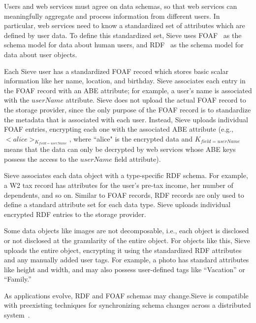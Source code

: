 Users and web services must agree on data schemas,
so that web services can meaningfully aggregate
and process information from different users. In
particular, web services need to know a
standardized set of attributes which are defined
by user data. To define this standardized set,
Sieve uses FOAF~\cite{FOAF} as the schema %
model for data about human users, and RDF~\cite{RDF} %
as the schema model for data about user objects.

Each Sieve user has a standardized FOAF record
which stores basic scalar information like
her name, location, and birthday. Sieve
associates each entry in the FOAF record
with an ABE attribute; for example, a user's
name is associated with the $userName$ attribute.
Sieve does not upload the actual FOAF record
to the storage provider, since the only purpose
of the FOAF record is to standardize the
metadata that is associated with each user.
Instead, Sieve uploads individual FOAF
entries, encrypting each one with the associated
ABE attribute (e.g., $<alice>_{K_{field=userName}}$,
where ``alice" is the encrypted data and $K_{field=userName}$
 means that the data can only be
decrypted by web services whose ABE keys
possess the access to the $userName$ field attribute).

Sieve associates each data object with a
type-specific RDF schema. For example, a
W2 tax record has attributes for the user's
pre-tax income, her number of dependents,
and so on. Similar to FOAF records, RDF
records are only used to define a standard
attribute set for each data type. Sieve uploads 
individual encrypted RDF entries
to the storage provider.

Some data objects like images are not
decomposable, i.e., each object is disclosed
or not disclosed at the granularity of the
entire object. For objects like this, Sieve
uploads the entire object, encrypting it
using the standardized RDF attributes and
any manually added user tags. For example,
a photo has standard attributes like height
and width, and may also possess user-defined
tags like ``Vacation'' or ``Family.''

As applications evolve, RDF and FOAF schemas
may change.Sieve is compatible with
preexisting techniques for synchronizing
schema changes across a distributed system~\cite{f1,maintaindataware, onthefly}.

